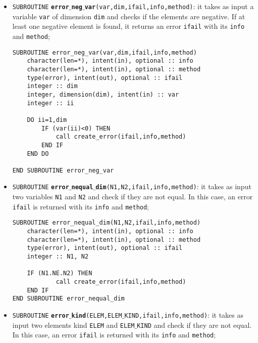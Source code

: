 \documentclass[rmp,10pt,onecolumn,fleqn,notitlepage]{revtex4-1}
\begin{document}
\begin{itemize}

    \item \texttt{SUBROUTINE} {\bfseries\texttt{error$\_$neg$\_$var}}\texttt{(var,dim,ifail,info,method)}: it takes as input a variable \texttt{var} of dimension \texttt{dim} and checks if the elements are negative. If at least one negative element is found, it returns an error \texttt{ifail} with its \texttt{info} and \texttt{method};

    \begin{minipage}[t]{0.55\linewidth}%
    \begin{lstlisting}[style=Fortran]
SUBROUTINE error_neg_var(var,dim,ifail,info,method)
    character(len=*), intent(in), optional :: info
    character(len=*), intent(in), optional :: method
    type(error), intent(out), optional :: ifail
    integer :: dim
    integer, dimension(dim), intent(in) :: var
    integer :: ii

    DO ii=1,dim
        IF (var(ii)<0) THEN
            call create_error(ifail,info,method)
        END IF
    END DO

END SUBROUTINE error_neg_var\end{lstlisting}
    \end{minipage}

    \item \texttt{SUBROUTINE} {\bfseries\texttt{error$\_$nequal$\_$dim}}\texttt{(N1,N2,ifail,info,method)}: it takes as input two variables \texttt{N1} and \texttt{N2} and check if they are not equal. In this case, an error \texttt{ifail} is returned  with its \texttt{info} and \texttt{method};

    \begin{minipage}[t]{0.55\linewidth}%
    \begin{lstlisting}[style=Fortran]
SUBROUTINE error_nequal_dim(N1,N2,ifail,info,method)
    character(len=*), intent(in), optional :: info
    character(len=*), intent(in), optional :: method
    type(error), intent(out), optional :: ifail
    integer :: N1, N2

    IF (N1.NE.N2) THEN
            call create_error(ifail,info,method)
    END IF
END SUBROUTINE error_nequal_dim\end{lstlisting}
    \end{minipage}

    \item \texttt{SUBROUTINE} {\bfseries\texttt{error$\_$kind}}\texttt{(ELEM,ELEM$\_$KIND,ifail,info,method)}: it takes as input two elements kind \texttt{ELEM} and \texttt{ELEM$\_$KIND} and check if they are not equal. In this case, an error \texttt{ifail} is returned  with its \texttt{info} and \texttt{method};


\end{itemize}
\end{document}
